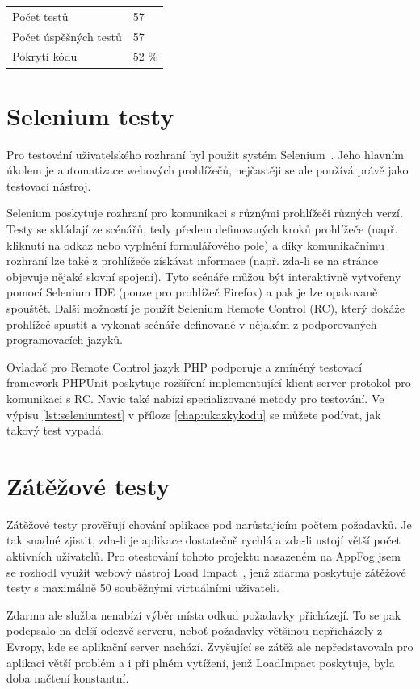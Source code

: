 \documentclass[11pt,twoside,a4paper]{book}
\begin{document}
\begin{table}[H]
    \center \begin{tabular}{ll}
    Počet testů           & 57  \\
    Počet úspěšných testů & 57  \\
    Pokrytí kódu          & 52 \%  \\
    \end{tabular}
\end{table}


\section{Selenium testy}
Pro testování uživatelského rozhraní byl použit systém Selenium~\cite{selenium}. Jeho hlavním úkolem je automatizace webových prohlížečů, nejčastěji se ale používá právě jako testovací nástroj. 

Selenium poskytuje rozhraní pro komunikaci s různými prohlížeči různých verzí. Testy se skládají ze scénářů, tedy předem definovaných kroků prohlížeče (např. kliknutí na odkaz nebo vyplnění formulářového pole) a díky komunikačnímu rozhraní lze také z prohlížeče získávat informace (např. zda-li se na stránce objevuje nějaké slovní spojení). Tyto scénáře můžou být interaktivně vytvořeny pomocí Selenium IDE (pouze pro prohlížeč Firefox) a pak je lze opakovaně spouštět. Další možností je použít Selenium Remote Control (RC), který dokáže prohlížeč spustit a vykonat scénáře definované v nějakém z podporovaných programovacích jazyků.

Ovladač pro Remote Control jazyk PHP podporuje a zmíněný testovací framework PHPUnit poskytuje rozšíření implementující klient-server protokol pro komunikaci s RC. Navíc také nabízí specializované metody pro testování. Ve výpisu \ref{lst:seleniumtest} v příloze \ref{chap:ukazkykodu} se můžete podívat, jak takový test vypadá.

\section{Zátěžové testy}
Zátěžové testy prověřují chování aplikace pod narůstajícím počtem požadavků. Je tak snadné zjistit, zda-li je aplikace dostatečně rychlá a zda-li ustojí větší počet aktivních uživatelů. Pro otestování tohoto projektu nasazeném na AppFog jsem se rozhodl využít webový nástroj Load Impact~\cite{loadimpact}, jenž zdarma poskytuje zátěžové testy s maximálně 50 souběžnými virtuálními uživateli. 

Zdarma ale služba nenabízí výběr místa odkud požadavky přicházejí. To se pak podepsalo na delší odezvě serveru, neboť požadavky většinou nepřicházely z Evropy, kde se aplikační server nachází. Zvyšující se zátěž ale nepředstavovala pro aplikaci větší problém a i při plném vytížení, jenž LoadImpact poskytuje, byla doba načtení konstantní.
\end{document}
